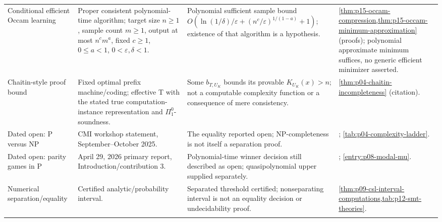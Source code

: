 \begin{landscape}
\begin{longtable}{@{}p{.18\linewidth}p{.25\linewidth}p{.23\linewidth}p{.26\linewidth}@{}}
Conditional efficient Occam learning & Proper consistent polynomial-time algorithm; target size \(n\geq1\), sample count \(m\geq1\), output at most \(n^c m^a\), fixed \(c\geq1\), \(0\leq a<1\), \(0<\varepsilon,\delta<1\). & Polynomial sufficient sample bound \(O(\ln(1/\delta)/\varepsilon+(n^c/\varepsilon)^{1/(1-a)}+1)\); existence of that algorithm is a hypothesis. & \cref{thm:p15-occam-compression,thm:p15-occam-minimum-approximation} (proofs); polynomial approximate minimum suffices, no generic efficient minimizer asserted.\\\addlinespace
Chaitin-style proof bound & Fixed optimal prefix machine/coding; effective T with the stated true computation-instance representation and \(\Pi^0_1\)-soundness. & Some \(b_{T,U_K}\) bounds its provable \(K_{U_K}(x)>n\); not a computable complexity function or a consequence of mere consistency. & \cref{thm:p04-chaitin-incompleteness} (citation).\\\addlinespace
Dated open: P versus NP & CMI workshop statement, September--October 2025. & The equality reported open; NP-completeness is not itself a separation proof. & \cite{ClayPVNP2025Workshop}; \cref{tab:p04-complexity-ladder}.\\\addlinespace
Dated open: parity games in P & April 29, 2026 primary report, Introduction/contribution 3. & Polynomial-time winner decision still described as open; quasipolynomial upper supplied separately. & \cite{SuilenPerez2026RobustMDPV1}; \cref{entry:p08-modal-mu}.\\\addlinespace
Numerical separation/equality & Certified analytic/probability interval. & Separated threshold certified; nonseparating interval is not an equality decision or undecidability proof. & \cref{thm:p09-csl-interval-computations,tab:p12-smt-theories}.\\\addlinespace
\end{longtable}
\endgroup
\end{landscape}

